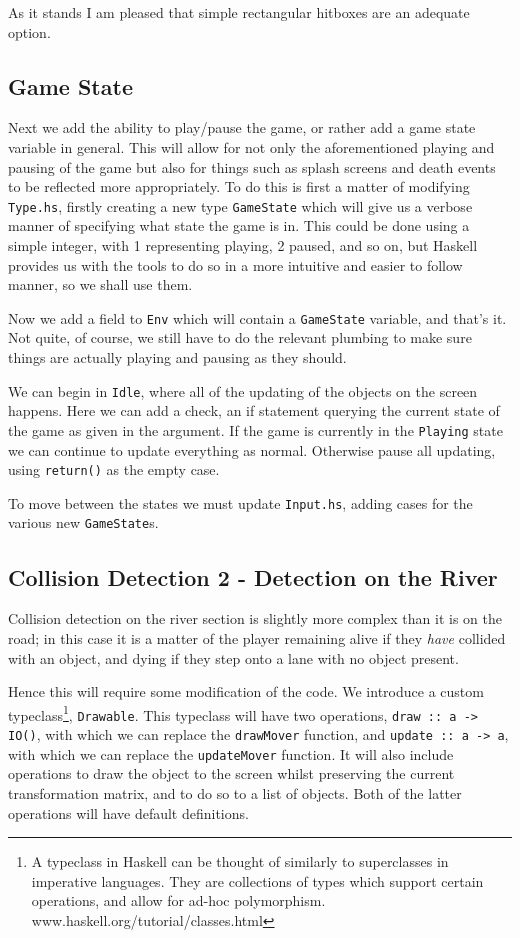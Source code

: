 \documentclass[12pt, a4paper]{report}
\begin{document}
As it stands I am pleased that simple rectangular hitboxes are an adequate option.

\subsection{Game State}

Next we add the ability to play/pause the game, or rather add a game state variable in general.
This will allow for not only the aforementioned playing and pausing of the game but also for things such as splash screens and death events to be reflected more appropriately.
To do this is first a matter of modifying \verb|Type.hs|, firstly creating a new type \verb|GameState| which will give us a verbose manner of specifying what state the game is in.
This could be done using a simple integer, with 1 representing playing, 2 paused, and so on, but Haskell provides us with the tools to do so in a more intuitive and easier to follow manner, so we shall use them.

Now we add a field to \verb|Env| which will contain a \verb|GameState| variable, and that's it.
Not quite, of course, we still have to do the relevant plumbing to make sure things are actually playing and pausing as they should.

\par

We can begin in \verb|Idle|, where all of the updating of the objects on the screen happens.
Here we can add a check, an if statement querying the current state of the game as given in the argument.
If the game is currently in the \verb|Playing| state we can continue to update everything as normal.
Otherwise pause all updating, using \verb|return()| as the empty case.

To move between the states we must update \verb|Input.hs|, adding cases for the various new \verb|GameState|s.

\subsection{Collision Detection 2 - Detection on the River}

Collision detection on the river section is slightly more complex than it is on the road; in this case it is a matter of the player remaining alive if they \textit{have} collided with an object, and dying if they step onto a lane with no object present.

Hence this will require some modification of the code.
We introduce a custom typeclass\footnote{A typeclass in Haskell can be thought of similarly to superclasses in imperative languages.
They are collections of types which support certain operations, and allow for ad-hoc polymorphism. www.haskell.org/tutorial/classes.html}, \verb|Drawable|.
This typeclass will have two operations, \verb|draw :: a -> IO()|, with which we can replace the \verb|drawMover| function, and \verb|update :: a -> a|, with which we can replace the \verb|updateMover| function.
It will also include operations to draw the object to the screen whilst preserving the current transformation matrix, and to do so to a list of objects.
Both of the latter operations will have default definitions.
\end{document}
